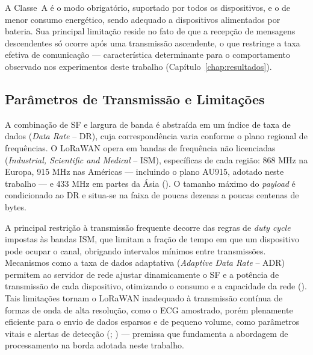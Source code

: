 A Classe~A é o modo obrigatório, suportado por todos os dispositivos, e o de menor consumo energético, sendo adequado a dispositivos alimentados por bateria. Sua principal limitação reside no fato de que a recepção de mensagens descendentes só ocorre após uma transmissão ascendente, o que restringe a taxa efetiva de comunicação — característica determinante para o comportamento observado nos experimentos deste trabalho (Capítulo~\ref{chap:resultados}).

\subsection{Parâmetros de Transmissão e Limitações}
\label{sec:paramsLora}

A combinação de SF e largura de banda é abstraída em um índice de taxa de dados (\textit{Data Rate} -- DR), cuja correspondência varia conforme o plano regional de frequências. O LoRaWAN opera em bandas de frequência não licenciadas (\textit{Industrial, Scientific and Medical} -- ISM), específicas de cada região: 868 MHz na Europa, 915 MHz nas Américas — incluindo o plano AU915, adotado neste trabalho — e 433 MHz em partes da Ásia (). O tamanho máximo do \textit{payload} é condicionado ao DR e situa-se na faixa de poucas dezenas a poucas centenas de bytes.

A principal restrição à transmissão frequente decorre das regras de \textit{duty cycle} impostas às bandas ISM, que limitam a fração de tempo em que um dispositivo pode ocupar o canal, obrigando intervalos mínimos entre transmissões. Mecanismos como a taxa de dados adaptativa (\textit{Adaptive Data Rate} -- ADR) permitem ao servidor de rede ajustar dinamicamente o SF e a potência de transmissão de cada dispositivo, otimizando o consumo e a capacidade da rede (). Tais limitações tornam o LoRaWAN inadequado à transmissão contínua de formas de onda de alta resolução, como o \acs{ECG} amostrado, porém plenamente eficiente para o envio de dados esparsos e de pequeno volume, como parâmetros vitais e alertas de detecção (; ) — premissa que fundamenta a abordagem de processamento na borda adotada neste trabalho.




